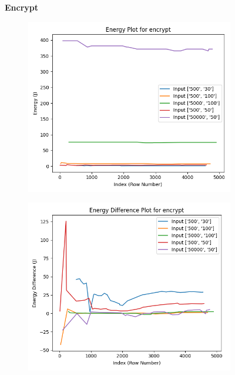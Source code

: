 \documentclass[times, 10pt,twocolumn]{article}
\begin{document}
\begin{figure}[ht]
   \textbf{Encrypt}\par\medskip
   \begin{subfigure}[b]{0.3\textwidth}
      \includegraphics[width=\textwidth]{imgs/final_experiment_plots/model_analysis/measurement_data_analysis/encrypt_energy.png}
     \caption{}
     \label{fig:encrypt_energy}
   \end{subfigure}
   \hfill
   \begin{subfigure}[b]{0.3\textwidth}
      \includegraphics[width=\textwidth]{imgs/final_experiment_plots/model_analysis/measurement_data_analysis/encrypt_energy_diff.png}

\end{subfigure}
\end{figure}
\end{document}
